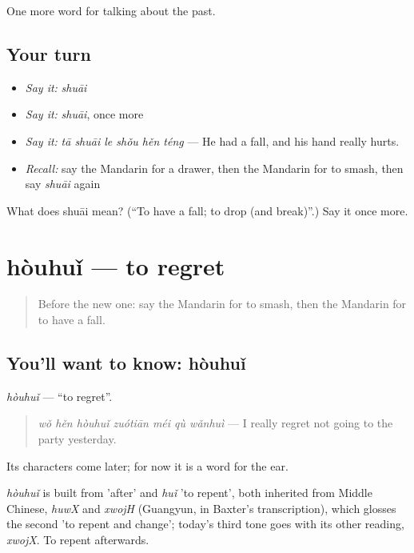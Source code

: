 \begin{grammarlens}[title={What you've built}]
One more word for talking about the past.
\end{grammarlens}

\subsection*{Your turn}
\begin{itemize}
\raggedright
  \item \emph{Say it:} \emph{shuāi}
  \item \emph{Say it:} \emph{shuāi}, once more
  \item \emph{Say it:} \emph{tā shuāi le shǒu hěn téng} — He had a fall, and his hand really hurts.
  \item \emph{Recall:} say the Mandarin for a drawer, then the Mandarin for to smash, then say \emph{shuāi} again
\end{itemize}

\begin{tcolorbox}[breakable,colback=teal!4,colframe=teal!35!black,title={Before you move on}]
What does shuāi mean? (\textquotedblleft{}To have a fall; to drop (and break)\textquotedblright{}.) Say it once more.
\end{tcolorbox}
\section[hòuhuǐ]{hòuhuǐ — to regret}

\label{lesson:ZH-C187-houhui}



\begin{quote}
Before the new one: say the Mandarin for to smash, then the Mandarin for to have a fall.
\end{quote}

\subsection*{You'll want to know: hòuhuǐ}
\emph{hòuhuǐ} — \textquotedblleft{}to regret\textquotedblright{}.

\begin{quote}
\emph{wǒ hěn hòuhuǐ zuótiān méi qù wǎnhuì} — I really regret not going to the party yesterday.
\end{quote}

Its characters come later; for now it is a word for the ear.

\begin{cousinweb}
\emph{hòuhuǐ} is built from  'after' and \emph{huǐ} 'to repent', both inherited from Middle Chinese, \emph{huwX} and \emph{xwojH} (Guangyun, in Baxter's transcription), which glosses the second 'to repent and change'; today's third tone goes with its other reading, \emph{xwojX}. To repent afterwards.
\end{cousinweb}


